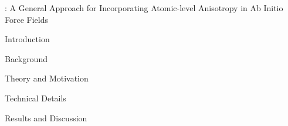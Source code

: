 \begin{chapter}{\mastiff: A General Approach for Incorporating Atomic-level
Anisotropy in Ab Initio Force Fields}
\label{ch:mastiff}

\begin{section}{Introduction}
\label{sec:intro}




\end{section}





\begin{section}{Background}
\label{sec:prior_work}



\end{section}




\begin{section}{Theory and Motivation}
\label{sec:theory}



\end{section}





\begin{section}{Technical Details}
\label{sec:methods}



\end{section}




\begin{section}{Results and Discussion}
\label{sec:results}




\end{section}
\end{chapter}
